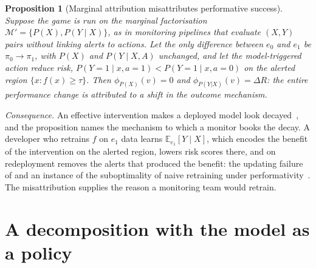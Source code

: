\documentclass[letterpaper]{article} %
\newtheorem{proposition}{Proposition}
\newcommand{\E}{\mathbb{E}}
\begin{document}
\begin{proposition}[Marginal attribution misattributes performative success]
\label{prop:misattr}
Suppose the game is run on the marginal factorisation
$\mathcal{M}' = \{P(X), P(Y \mid X)\}$, as in monitoring pipelines that
evaluate $(X, Y)$ pairs without linking alerts to actions. Let the only
difference between $e_0$ and $e_1$ be
$\pi_0 \to \pi_1$, with $P(X)$ and $P(Y \mid X, A)$ unchanged, and let the
model-triggered action reduce risk, $P(Y{=}1 \mid x, a{=}1) < P(Y{=}1 \mid x,
a{=}0)$ on the alerted region $\{x : f(x) \geq \tau\}$. Then
$\phi_{P(X)}(v) = 0$ and $\phi_{P(Y|X)}(v) = \Delta R$: the entire performance
change is attributed to a shift in the outcome mechanism.
\end{proposition}

\noindent\emph{Consequence.} An effective intervention makes a deployed model
look decayed~\citep{ansari2025challenges}, and the proposition names the
mechanism to which a monitor books the decay. A developer who retrains $f$ on
$e_1$ data learns $\E_{e_1}[Y \mid X]$, which encodes the benefit of the
intervention on the alerted region, lowers risk scores there, and on
redeployment removes the alerts that produced the benefit: the updating
failure of \citet[Theorem~1]{liley2021model} and an instance of the
suboptimality of naive retraining under
performativity~\citep{kabra2024limitations}. The misattribution supplies the
reason a monitoring team would retrain.

\section{A decomposition with the model as a policy}
\label{sec:estimand}
\end{document}
